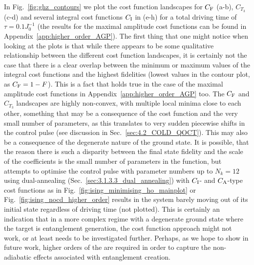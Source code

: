 In Fig.~\ref{fig:ghz_contours} we plot the cost function landscapes for $C_{\rm F}$ (a-b), $C_{T_3}$ (c-d) and several integral cost functions $C_{\rm I}$ in (e-h) for a total driving time of $\tau = 0.1J_0^{-1}$ (the results for the maximal amplitude cost functions can be found in Appendix~\ref{app:higher_order_AGP}). The first thing that one might notice when looking at the plots is that while there appears to be some qualitative relationship between the different cost function landscapes, it is certainly not the case that there is a clear overlap between the minimum or maximum values of the integral cost functions and the highest fidelities (lowest values in the contour plot, as $C_{\rm F} = 1 - F$). This is a fact that holds true in the case of the maximal amplitude cost functions in Appendix~\ref{app:higher_order_AGP} too. The $C_{\rm F}$ and $C_{T_3}$ landscapes are highly non-convex, with multiple local minima close to each other, something that may be a consequence of the  cost function and the very small number of parameters, as this translates to very sudden piecewise shifts in the control pulse (see discussion in Sec.~\ref{sec:4.2_COLD_QOCT}). This may also be a consequence of the degenerate nature of the ground state. It is possible, that the reason there is such a disparity between the final state fidelity and the scale of the  coefficients is the small number of parameters in the  function, but attempts to optimise the  control pulse with parameter numbers up to $N_k = 12$ using dual-annealing (Sec.~\ref{sec:3.1.3.3_dual_annealing}) with $C_{\rm I}$- and $C_{\rm A}$-type cost functions as in Fig.~\ref{fig:ising_minimising_ho_mainplot} or Fig.~\ref{fig:ising_nocd_higher_order} results in the system barely moving out of its initial state regardless of driving time (not plotted). This is certainly an indication that in a more complex regime with a degenerate ground state where the target is entanglement generation, the  cost function approach might not work, or at least needs to be investigated further. Perhaps, as we hope to show in future work, higher orders of the  are required in order to capture the non-adiabatic effects associated with entanglement creation.

